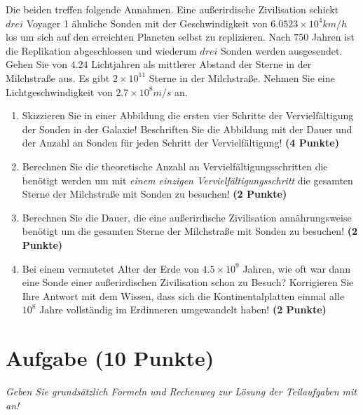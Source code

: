 \documentclass[a4paper, 9pt]{scrartcl}\usepackage[]{graphicx}\usepackage[]{xcolor}
\begin{document}
Die beiden treffen folgende Annahmen. Eine außerirdische Zivilisation schickt $drei$ Voyager 1 ähnliche Sonden mit der Geschwindigkeit von $\ensuremath{6.0523\times 10^{4}}km/h$ los um sich auf den erreichten Planeten selbst zu replizieren. Nach $750$ Jahren ist die Replikation abgeschlossen und wiederum $drei$ Sonden werden ausgesendet. Gehen Sie von $4.24$ Lichtjahren als mittlerer Abstand der Sterne in der Milchstraße aus. Es gibt $\ensuremath{2\times 10^{11}}$ Sterne in der Milchstraße. Nehmen Sie eine Lichtgeschwindigkeit von $\ensuremath{2.7\times 10^{8}}m/s$ an.

\begin{enumerate}
\item Skizzieren Sie in einer Abbildung die ersten vier Schritte der Vervielfältigung der Sonden in der Galaxie! Beschriften Sie die Abbildung mit der Dauer und der Anzahl an Sonden für jeden Schritt der Vervielfältigung! \textbf{(4 Punkte)}
\item Berechnen Sie die theoretische Anzahl an Vervielfältigungsschritten die benötigt werden um mit \textit{einem einzigen Vervielfältigungsschritt} die gesamten Sterne der Milchstraße mit Sonden zu besuchen! \textbf{(2 Punkte)}
\item Berechnen Sie die Dauer, die eine außerirdische Zivilisation annährungsweise benötigt um die gesamten Sterne der Milchstraße mit Sonden zu besuchen! \textbf{(2 Punkte)}
\item Bei einem vermutetet Alter der Erde von $\ensuremath{4.5\times 10^{9}}$ Jahren, wie oft war dann eine Sonde einer außerirdischen Zivilisation schon zu Besuch? Korrigieren Sie Ihre Antwort mit dem Wissen, dass sich die Kontinentalplatten einmal alle $\ensuremath{10^{8}}$ Jahre vollständig im Erdinneren umgewandelt haben! \textbf{(2 Punkte)}
\end{enumerate}


 
\clearpage

\section{Aufgabe \hfill (10 Punkte)}

\textit{Geben Sie grundsätzlich Formeln und Rechenweg zur Lösung der Teilaufgaben mit an!} \\[1Ex]
 
\end{document}
